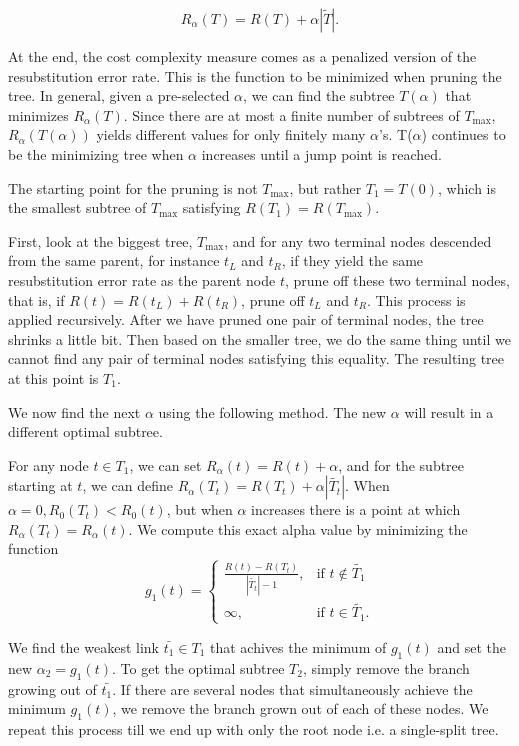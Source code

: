 $$
  R_{\alpha}(T) = R(T) + \alpha |\tilde{T}|.
$$

At the end, the cost complexity measure comes as a penalized version of the
resubstitution error rate. This is the function to be minimized when pruning the
tree. In general, given a pre-selected $\alpha$, we can find the subtree
$T(\alpha)$ that minimizes $R_\alpha(T)$. Since there are at most a finite
number of subtrees of $T_{\text{max}}$, $R_\alpha(T(\alpha))$ yields different
values for only finitely many $\alpha$'s. T($\alpha$) continues to be the
minimizing tree when $\alpha$ increases until a jump point is reached.


The starting point for the pruning is not $T_{\text{max}}$, but rather
$T_1 = T(0)$, which is the smallest subtree of $T_{\text{max}}$ satisfying
$R(T_1) = R(T_{\text{max}})$.

First, look at the biggest tree, $T_{\text{max}}$, and for any two terminal
nodes descended from the same parent, for instance $t_L$ and $t_R$, if they
yield the same resubstitution error rate as the parent node $t$, prune off these
two terminal nodes, that is, if $R(t) = R(t_L) + R(t_R)$, prune off $t_L$ and
$t_R$. This process is applied recursively. After we have pruned one pair of
terminal nodes, the tree shrinks a little bit. Then based on the smaller tree,
we do the same thing until we cannot find any pair of terminal nodes satisfying
this equality. The resulting tree at this point is $T_1$.

We now find the next $\alpha$ using the following method. The new
$\alpha$ will result in a different optimal subtree.

For any node $t \in T_1$, we can set $R_\alpha({t}) = R(t) + \alpha$, and for
the subtree starting at $t$, we can define $R_\alpha(T_t) = R(T_t) + \alpha |\tilde{T_t}|$.
When $\alpha = 0, R_0(T_t) < R_0({t})$, but when $\alpha$ increases there is a point
at which $R_\alpha(T_t) = R_\alpha({t})$. We compute this exact alpha value by minimizing the
function
\begin{equation*}
    g_1(t) = \begin{cases}
                \frac{R(t) - R(T_t)}{|\tilde{T_t}| - 1},  & \mbox{if } t \notin \tilde{T_1} \\
                \infty, & \mbox{if } t \in \tilde{T_1}.
             \end{cases}
\end{equation*}

We find the weakest link $\bar{t_1} \in T_1$ that achives the minimum of
$g_1(t)$  and set the new $\alpha_2 = g_1(t)$. To get the optimal subtree $T_2$,
simply remove the branch growing out of $\bar{t_1}$. If there are several nodes
that simultaneously achieve the minimum $g_1(t)$, we remove the branch grown out of
each of these nodes. We repeat this process till we end up with only the root
node i.e. a single-split tree.

